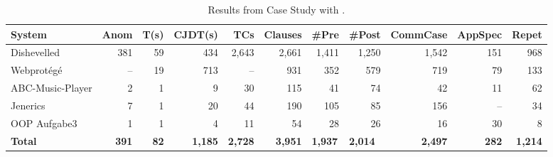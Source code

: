 \begin{table}
\centering
\caption{Results from Case Study with \contractjdoc{}.}
\label{tab:caseStudyResults}
\begin{adjustbox}{width=\textwidth}
\begin{tabular}{lrrrrrrrrrr} 
\toprule
 \textbf{System}  & \textbf{Anom} & \textbf{T(s)}  & \multicolumn{1}{l}{\textbf{CJDT}(s)} & \textbf{TCs}      & \textbf{Clauses}  & \multicolumn{1}{l}{\#\textbf{Pre}} & \multicolumn{1}{l}{\#\textbf{Post}} & \textbf{CommCase}  & \textbf{AppSpec}  & \textbf{Repet}    \\ 
\toprule
Dishevelled       & 381           & 59                & 434                                     & 2,643             & 2,661             & 1,411                              & 1,250                               & 1,542              & 151               & 968               \\
Webprotégé        & --             & 19                & 713                                     & --                 & 931               & 352                                & 579                                 & 719                & 79                & 133               \\
ABC-Music-Player  & 2             & 1                 & 9                                       & 30                & 115               & 41                                 & 74                                  & 42                 & 11                & 62                \\
Jenerics          & 7             & 1                 & 20                                      & 44                & 190               & 105                                & 85                                  & 156                & --                 & 34                \\
OOP Aufgabe3      & 1             & 1                 & 4                                       & 11                & 54                & 28                                 & 26                                  & 16                 & 30                & 8                 \\ 
\bottomrule
\textbf{ Total }  & \textbf{391}  & \textbf{82}       & \textbf{1,185}                          & \textbf{ 2,728 }  & \textbf{3,951}    & \multicolumn{1}{l}{\textbf{1,937}} & \multicolumn{1}{l}{\textbf{2,014}}  & \textbf{ 2,497 }   & \textbf{ 282 }    & \textbf{ 1,214}   \\
\bottomrule
\end{tabular}
\end{adjustbox}
\end{table}



